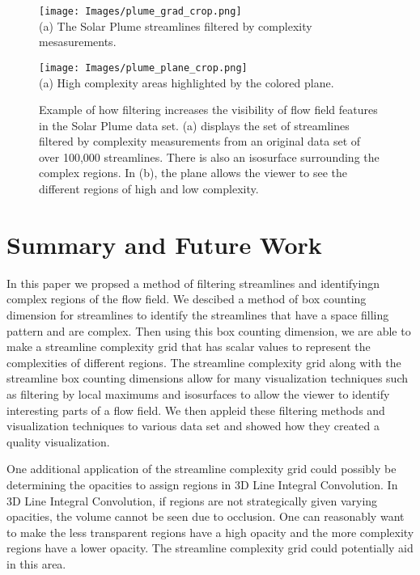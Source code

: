 \documentclass{egpubl}
\begin{document}
\begin{figure}[h]
        \centering
               	\begin{minipage}{0.47\linewidth}
                        \texttt{[image: Images/plume\_grad\_crop.png]}\\(a) The Solar Plume streamlines filtered by complexity mesasurements. \vspace{0.2em}
                \end{minipage}
                \begin{minipage}{0.47\linewidth}
                        \texttt{[image: Images/plume\_plane\_crop.png]}\\(a) High complexity areas highlighted by the colored plane. \vspace{0.2em}
                \end{minipage}
        \caption{Example of how filtering increases the visibility of flow field features in the Solar Plume data set. (a) displays the set of streamlines filtered by complexity measurements from an original data set of over 100,000 streamlines. There is also an isosurface surrounding the complex regions. In (b), the plane allows the viewer to see the different regions of high and low complexity.}
        \label{fig:plume_lines}
\end{figure}

\section{Summary and Future Work}

In this paper we propsed a method of filtering streamlines and identifyingn complex regions of the flow field.
We descibed a method of box counting dimension for streamlines to identify the streamlines that have a space filling pattern and are complex.
Then using this box counting dimension, we are able to make a streamline complexity grid that has scalar values to represent the complexities of different regions.
The streamline complexity grid along with the streamline box counting dimensions allow for many visualization techniques such as filtering by local maximums and isosurfaces to allow the viewer to identify interesting parts of a flow field.
We then appleid these filtering methods and visualization techniques to various data set and showed how they created a quality visualization.

One additional application of the streamline complexity grid could possibly be determining the opacities to assign regions in 3D Line Integral Convolution.
In 3D Line Integral Convolution, if regions are not strategically given varying opacities, the volume cannot be seen due to occlusion.
One can reasonably want to make the less transparent regions have a high opacity and the more complexity regions have a lower opacity.
The streamline complexity grid could potentially aid in this area.


\clearpage
%


\end{document}
